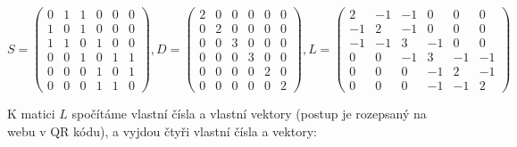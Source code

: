 \documentclass[10pt,a4paper]{article}
\begin{document}
\begin{equation}
S = 
\left( \begin{array}{cccccc}
0 & 1 & 1 & 0 & 0 & 0\\
1 & 0 & 1 & 0 & 0 & 0\\
1 & 1 & 0 & 1 & 0 & 0\\
0 & 0 & 1 & 0 & 1 & 1\\
0 & 0 & 0 & 1 & 0 & 1\\
0 & 0 & 0 & 1 & 1 & 0\end{array} \right)
%
,
%
D = 
\left( \begin{array}{cccccc}
2 & 0 & 0 & 0 & 0 & 0\\
0 & 2 & 0 & 0 & 0 & 0\\
0 & 0 & 3 & 0 & 0 & 0\\
0 & 0 & 0 & 3 & 0 & 0\\
0 & 0 & 0 & 0 & 2 & 0\\
0 & 0 & 0 & 0 & 0 & 2\end{array} \right)
%
,
%
L = 
\left( \begin{array}{cccccc}
2 & -1 & -1 & 0 & 0 & 0\\
-1 & 2 & -1 & 0 & 0 & 0\\
-1 & -1 & 3 & -1 & 0 & 0\\
0 & 0 & -1 & 3 & -1 & -1\\
0 & 0 & 0 & -1 & 2 & -1\\
0 & 0 & 0 & -1 & -1 & 2\end{array} \right)
\end{equation}

K matici $L$ spočítáme vlastní čísla a vlastní vektory (postup je rozepsaný na webu v QR kódu), a vyjdou čtyři vlastní čísla a vektory:
\end{document}
